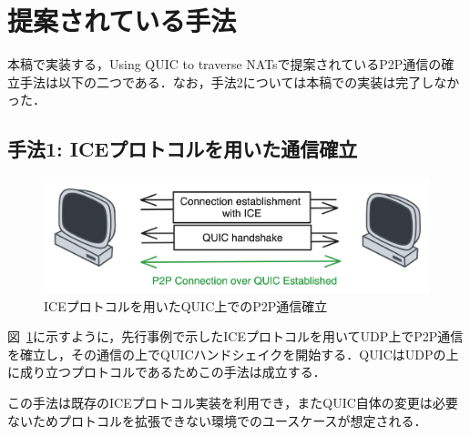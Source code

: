 \section{提案されている手法}
本稿で実装する，Using QUIC to traverse NATsで提案されているP2P通信の確立手法は以下の二つである．なお，手法2については本稿での実装は完了しなかった．

\subsection{手法1: ICEプロトコルを用いた通信確立}
\begin{figure}[h]
  \centering
  \includegraphics[width=\linewidth]{figs/approach-1.png}
  \caption{ICEプロトコルを用いたQUIC上でのP2P通信確立}
  \label{fig:one}
\end{figure}
図~\ref{fig:one}に示すように，先行事例で示したICEプロトコルを用いてUDP上でP2P通信を確立し，その通信の上でQUICハンドシェイクを開始する．QUICはUDPの上に成り立つプロトコルであるためこの手法は成立する．

この手法は既存のICEプロトコル実装を利用でき，またQUIC自体の変更は必要ないためプロトコルを拡張できない環境でのユースケースが想定される．


